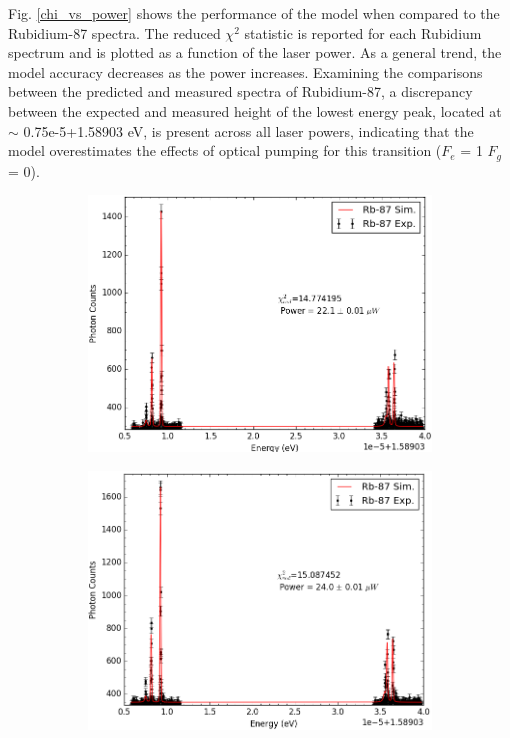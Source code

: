 Fig. \ref{chi_vs_power} shows the performance of the model when compared to the Rubidium-87 spectra. The reduced $\chi^2$ statistic is reported for each Rubidium spectrum and is plotted as a function of the laser power. As a general trend, the model accuracy decreases as the power increases. Examining the comparisons between the predicted and measured spectra of Rubidium-87, a discrepancy between the expected and measured height of the lowest energy peak, located at $\sim$ 0.75e-5+1.58903 eV, is present across all laser powers, indicating that the model overestimates the effects of optical pumping for this transition ($F_e$ = 1 $F_g$ = 0).

\begin{figure}[t!]
	\centering
    \begin{subfigure}[b]{0.49\textwidth}
        \includegraphics[width=\textwidth]{Graphics/107_108.png}
        \caption{}
    \end{subfigure}
    \begin{subfigure}[b]{0.49\textwidth}
        \includegraphics[width=\textwidth]{Graphics/094_095.png}
        \caption{}
        \label{}
    \end{subfigure}


\end{figure}
